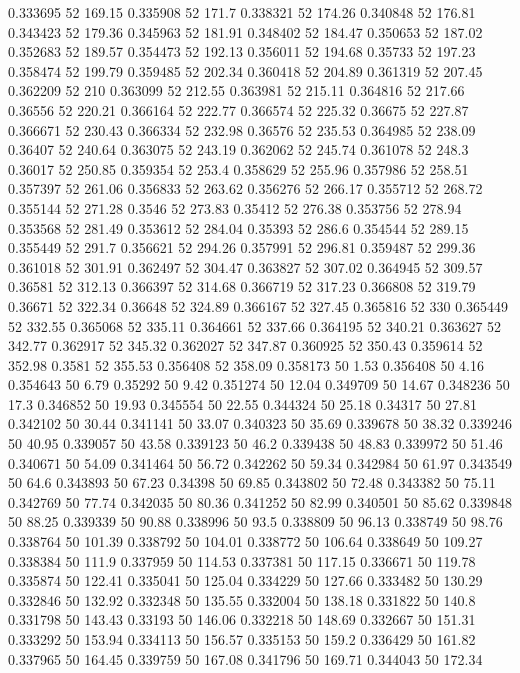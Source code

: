 0.333695 52 169.15
0.335908 52 171.7
0.338321 52 174.26
0.340848 52 176.81
0.343423 52 179.36
0.345963 52 181.91
0.348402 52 184.47
0.350653 52 187.02
0.352683 52 189.57
0.354473 52 192.13
0.356011 52 194.68
0.35733 52 197.23
0.358474 52 199.79
0.359485 52 202.34
0.360418 52 204.89
0.361319 52 207.45
0.362209 52 210
0.363099 52 212.55
0.363981 52 215.11
0.364816 52 217.66
0.36556 52 220.21
0.366164 52 222.77
0.366574 52 225.32
0.36675 52 227.87
0.366671 52 230.43
0.366334 52 232.98
0.36576 52 235.53
0.364985 52 238.09
0.36407 52 240.64
0.363075 52 243.19
0.362062 52 245.74
0.361078 52 248.3
0.36017 52 250.85
0.359354 52 253.4
0.358629 52 255.96
0.357986 52 258.51
0.357397 52 261.06
0.356833 52 263.62
0.356276 52 266.17
0.355712 52 268.72
0.355144 52 271.28
0.3546 52 273.83
0.35412 52 276.38
0.353756 52 278.94
0.353568 52 281.49
0.353612 52 284.04
0.35393 52 286.6
0.354544 52 289.15
0.355449 52 291.7
0.356621 52 294.26
0.357991 52 296.81
0.359487 52 299.36
0.361018 52 301.91
0.362497 52 304.47
0.363827 52 307.02
0.364945 52 309.57
0.36581 52 312.13
0.366397 52 314.68
0.366719 52 317.23
0.366808 52 319.79
0.36671 52 322.34
0.36648 52 324.89
0.366167 52 327.45
0.365816 52 330
0.365449 52 332.55
0.365068 52 335.11
0.364661 52 337.66
0.364195 52 340.21
0.363627 52 342.77
0.362917 52 345.32
0.362027 52 347.87
0.360925 52 350.43
0.359614 52 352.98
0.3581 52 355.53
0.356408 52 358.09
0.358173 50 1.53
0.356408 50 4.16
0.354643 50 6.79
0.35292 50 9.42
0.351274 50 12.04
0.349709 50 14.67
0.348236 50 17.3
0.346852 50 19.93
0.345554 50 22.55
0.344324 50 25.18
0.34317 50 27.81
0.342102 50 30.44
0.341141 50 33.07
0.340323 50 35.69
0.339678 50 38.32
0.339246 50 40.95
0.339057 50 43.58
0.339123 50 46.2
0.339438 50 48.83
0.339972 50 51.46
0.340671 50 54.09
0.341464 50 56.72
0.342262 50 59.34
0.342984 50 61.97
0.343549 50 64.6
0.343893 50 67.23
0.34398 50 69.85
0.343802 50 72.48
0.343382 50 75.11
0.342769 50 77.74
0.342035 50 80.36
0.341252 50 82.99
0.340501 50 85.62
0.339848 50 88.25
0.339339 50 90.88
0.338996 50 93.5
0.338809 50 96.13
0.338749 50 98.76
0.338764 50 101.39
0.338792 50 104.01
0.338772 50 106.64
0.338649 50 109.27
0.338384 50 111.9
0.337959 50 114.53
0.337381 50 117.15
0.336671 50 119.78
0.335874 50 122.41
0.335041 50 125.04
0.334229 50 127.66
0.333482 50 130.29
0.332846 50 132.92
0.332348 50 135.55
0.332004 50 138.18
0.331822 50 140.8
0.331798 50 143.43
0.33193 50 146.06
0.332218 50 148.69
0.332667 50 151.31
0.333292 50 153.94
0.334113 50 156.57
0.335153 50 159.2
0.336429 50 161.82
0.337965 50 164.45
0.339759 50 167.08
0.341796 50 169.71
0.344043 50 172.34

